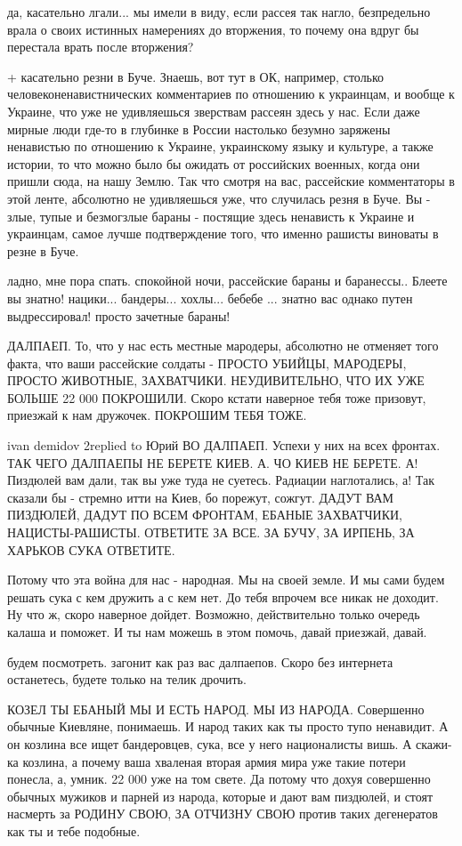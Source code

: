 да, касательно лгали... мы имели в виду, если рассея так нагло, безпредельно
врала о своих истинных намерениях до вторжения, то почему она вдруг бы
перестала врать после вторжения?

+ касательно резни в Буче. Знаешь, вот тут в ОК, например, столько
человеконенавистнических комментариев по отношению к украинцам, и вообще к
Украине, что уже не удивляешься зверствам рассеян здесь у нас. Если даже мирные
люди где-то в глубинке в России настолько безумно заряжены ненавистью по
отношению к Украине, украинскому языку и культуре, а также истории, то что
можно было бы ожидать от российских военных, когда они пришли сюда, на нашу
Землю. Так что смотря на вас, рассейские комментаторы в этой ленте, абсолютно
не удивляешься уже, что случилась резня в Буче. Вы - злые, тупые и безмогзлые
бараны - постящие здесь ненависть к Украине и украинцам, самое лучше
подтверждение того, что именно рашисты виноваты в резне в Буче.

ладно, мне пора спать. спокойной ночи, рассейские бараны и баранессы.. Блеете
вы знатно! нацики... бандеры... хохлы... бебебе ... знатно вас однако путен
выдрессировал! просто зачетные бараны!

ДАЛПАЕП. То, что у нас есть местные мародеры, абсолютно не отменяет того факта,
что ваши рассейские солдаты - ПРОСТО УБИЙЦЫ, МАРОДЕРЫ, ПРОСТО ЖИВОТНЫЕ,
ЗАХВАТЧИКИ. НЕУДИВИТЕЛЬНО, ЧТО ИХ УЖЕ БОЛЬШЕ 22 000 ПОКРОШИЛИ. Скоро кстати
наверное тебя тоже призовут, приезжай к нам дружочек. ПОКРОШИМ ТЕБЯ ТОЖЕ.

ivan demidov 2replied to Юрий ВО ДАЛПАЕП. Успехи у них на всех фронтах. ТАК
ЧЕГО ДАЛПАЕПЫ НЕ БЕРЕТЕ КИЕВ. А. ЧО КИЕВ НЕ БЕРЕТЕ. А! Пиздюлей вам дали, так
вы уже туда не суетесь. Радиации наглотались, а! Так сказали бы - стремно итти
на Киев, бо порежут, сожгут. ДАДУТ ВАМ ПИЗДЮЛЕЙ, ДАДУТ ПО ВСЕМ ФРОНТАМ, ЕБАНЫЕ
ЗАХВАТЧИКИ, НАЦИСТЫ-РАШИСТЫ. ОТВЕТИТЕ ЗА ВСЕ. ЗА БУЧУ, ЗА ИРПЕНЬ, ЗА ХАРЬКОВ
СУКА ОТВЕТИТЕ.

Потому что эта война для нас - народная. Мы на своей земле. И мы сами будем
решать сука с кем дружить а с кем нет. До тебя впрочем все никак не доходит. Ну
что ж, скоро наверное дойдет. Возможно, действительно только очередь калаша и
поможет. И ты нам можешь в этом помочь, давай приезжай, давай.

будем посмотреть. загонит как раз вас далпаепов. Скоро без интернета
останетесь, будете только на телик дрочить.

КОЗЕЛ ТЫ ЕБАНЫЙ МЫ И ЕСТЬ НАРОД. МЫ ИЗ НАРОДА. Совершенно обычные Киевляне,
понимаешь. И народ таких как ты просто тупо ненавидит. А он козлина все ищет
бандеровцев, сука, все у него националисты вишь. А скажи-ка козлина, а почему
ваша хваленая вторая армия мира уже такие потери понесла, а, умник. 22 000 уже
на том свете. Да потому что дохуя совершенно обычных мужиков и парней из
народа, которые и дают вам пиздюлей, и стоят насмерть за РОДИНУ СВОЮ, ЗА
ОТЧИЗНУ СВОЮ против таких дегенератов как ты и тебе подобные.

